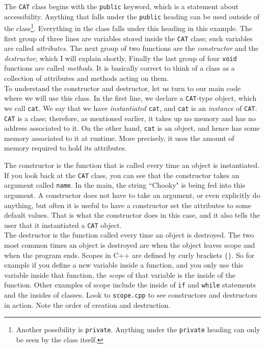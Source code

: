 The \texttt{CAT} class begins with the \texttt{public} keyword, which
is a statement about accessibility. Anything that falls under the
\texttt{public} heading can be used outside of the class\footnote{Another
possibility is \texttt{private}. Anything under the \texttt{private} heading
can only be seen by the class itself.}. Everything in the class falls
under this heading in this example. The first group of three lines
are variables stored inside the \texttt{CAT} class; such variables
are called {\it attributes}. The next group of two functions are
the {\it constructor} and the {\it destructor}, which I will explain
shortly. Finally the last group of four \texttt{void} functions are 
called {\it methods}. It is basically correct to think of a class as a
collection of attributes and methods acting on them.\\



To understand the constructor and destructor, let us turn to our main
code where we will use this class. In the first line, we declare a
\texttt{CAT}-type object, which we call \texttt{cat}. We say that we have
{\it instantiated} \texttt{cat}, and \texttt{cat} is an {\it instance}
of \texttt{CAT}. \texttt{CAT} is a class; therefore, as mentioned
earlier, it takes up no memory and has no address associated to it.
On the other hand, \texttt{cat} is an object, and hence has some
memory associated to it at runtime. More precisely, it uses the
amount of memory required to hold its attributes.

The constructor is the function that is called every time an object is
instantiated. If you look back at the \texttt{CAT} class, you can see that
the constructor takes an argument called \texttt{name}. In the main,
the string ``Chooky" is being fed into this argument. A constructor does
not have to take an argument, or even explicitly do anything, but often
it is useful to have a constructor set the attributes to some default values.
That is what the constructor does in this case, and it also tells the
user that it instantiated a \texttt{CAT} object.\\



The destructor is the function called every time an object is destroyed.
The two most common times an object is destroyed are when the object
leaves scope and when the program ends. Scopes in C++ are defined by
curly brackets $\{\}$. So for example if you define a new variable
inside a function, and you only use this variable inside that function,
the {\it scope} of that variable is the inside of the function. 
Other examples of scope include
the inside of \texttt{if} and \texttt{while} statements and the
insides of classes. Look to \texttt{scope.cpp} to see constructors and
destructors in action. Note the order of creation and destruction.

